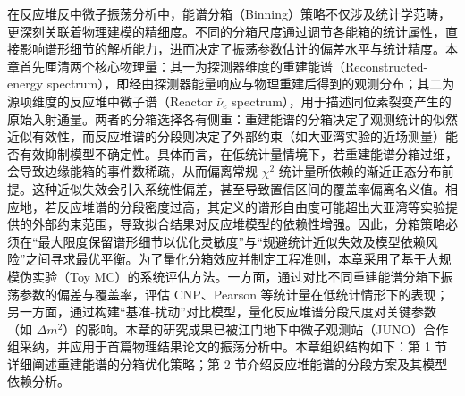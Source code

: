 在反应堆反中微子振荡分析中，能谱分箱（Binning）策略不仅涉及统计学范畴，更深刻关联着物理建模的精细度。不同的分箱尺度通过调节各能箱的统计属性，直接影响谱形细节的解析能力，进而决定了振荡参数估计的偏差水平与统计精度。本章首先厘清两个核心物理量：其一为探测器维度的重建能谱（Reconstructed-energy spectrum），即经由探测器能量响应与物理重建后得到的观测分布；其二为源项维度的反应堆中微子谱（Reactor $\bar\nu_e$ spectrum），用于描述同位素裂变产生的原始入射通量。两者的分箱选择各有侧重：重建能谱的分箱决定了观测统计的似然近似有效性，而反应堆谱的分段则决定了外部约束（如大亚湾实验的近场测量）能否有效抑制模型不确定性。具体而言，在低统计量情境下，若重建能谱分箱过细，会导致边缘能箱的事件数稀疏，从而偏离常规 $\chi^2$ 统计量所依赖的渐近正态分布前提。这种近似失效会引入系统性偏差，甚至导致置信区间的覆盖率偏离名义值。相应地，若反应堆谱的分段密度过高，其定义的谱形自由度可能超出大亚湾等实验提供的外部约束范围，导致拟合结果对反应堆模型的依赖性增强。因此，分箱策略必须在“最大限度保留谱形细节以优化灵敏度”与“规避统计近似失效及模型依赖风险”之间寻求最优平衡。为了量化分箱效应并制定工程准则，本章采用了基于大规模伪实验（Toy MC）的系统评估方法。一方面，通过对比不同重建能谱分箱下振荡参数的偏差与覆盖率，评估 CNP、Pearson 等统计量在低统计情形下的表现；另一方面，通过构建“基准-扰动”对比模型，量化反应堆谱分段尺度对关键参数（如 $\Delta m^2$）的影响。本章的研究成果已被江门地下中微子观测站（JUNO）合作组采纳，并应用于首篇物理结果论文的振荡分析中。本章组织结构如下：第 1 节详细阐述重建能谱的分箱优化策略；第 2 节介绍反应堆能谱的分段方案及其模型依赖分析。
